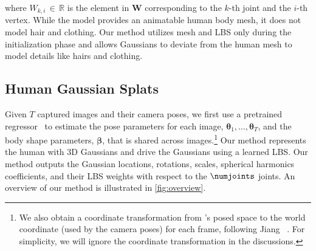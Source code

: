 %
%
where $W_{k,i} \, {\in} \, \mathbb{R}$ is the element in $\bm{W}$ corresponding to the $k$-th joint and the $i$-th vertex. 
%
While the \smpl model provides an animatable human body mesh, it does not model hair and clothing. 
%
Our method utilizes \smpl mesh and LBS only during the initialization phase and allows Gaussians to deviate from the human mesh to model details like hairs and clothing. 
%
%


\subsection{Human Gaussian Splats}

Given $T$ captured images and their camera poses, we first use a pretrained \smpl regressor~\cite{goel2023humans4d} to estimate the \smpl pose parameters for each image, $\bm{\theta}_1, \dots, \bm{\theta}_T$, and the body shape parameters, $\bm\beta$, that is shared across images.\footnote{We also obtain a coordinate transformation from \smpl's posed space to the world coordinate (used by the camera poses) for each frame, following Jiang \etal~\cite{jiang2022neuman}. For simplicity, we will ignore the coordinate transformation in the discussions.} 
%
Our method represents the human with 3D Gaussians and drive the Gaussians using a learned LBS. 
%
Our method outputs the Gaussian locations, rotations, scales, spherical harmonics coefficients, and their LBS weights with respect to the $\numjoints$ joints. 
%
%
%
An overview of our method is illustrated in \cref{fig:overview}. 


